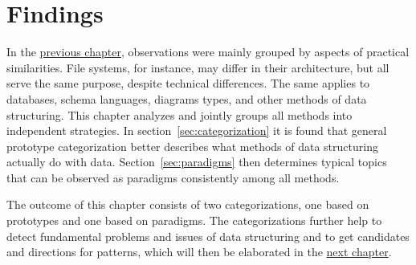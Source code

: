 \chapter{Findings}
\label{ch:findings}

In the \hyperref[ch:methods]{previous chapter}, observations were mainly
grouped by aspects of practical similarities. File systems, for instance, may
differ in their architecture, but all serve the same purpose, despite technical
differences. The same applies to databases, schema languages, diagrams types,
and other methods of data structuring.  This chapter analyzes and jointly
groups all methods into independent strategies.  In
section~\ref{sec:categorization} it is found that general prototype
categorization better describes what methods of data structuring actually do
with data. Section~\ref{sec:paradigms} then determines typical topics that can
be observed as paradigms consistently among all methods.

The outcome of this chapter consists of two categorizations, one based on
prototypes and one based on paradigms. The categorizations further help to
detect fundamental problems and issues of data structuring and to get
candidates and directions for patterns, which will then be elaborated in the
\hyperref[ch:patterns]{next chapter}.




